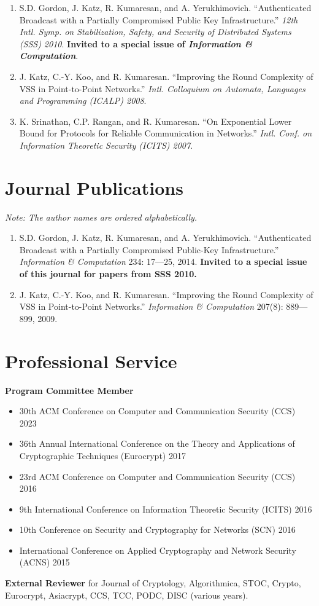 \documentclass[11pt]{article}
\begin{document}
\begin{enumerate}[leftmargin=*, itemsep=1pt]
    \item S.D. Gordon, J. Katz, R. Kumaresan, and A. Yerukhimovich. ``Authenticated Broadcast with a Partially Compromised Public Key Infrastructure.'' \textit{12th Intl. Symp. on Stabilization, Safety, and Security of Distributed Systems (SSS) 2010}. \textbf{Invited to a special issue of \textit{Information \& Computation}}.
    
    \item J. Katz, C.-Y. Koo, and R. Kumaresan. ``Improving the Round Complexity of VSS in Point-to-Point Networks.'' \textit{Intl. Colloquium on Automata, Languages and Programming (ICALP) 2008}.
    
    \item K. Srinathan, C.P. Rangan, and R. Kumaresan. ``On Exponential Lower Bound for Protocols for Reliable Communication in Networks.'' \textit{Intl. Conf. on Information Theoretic Security (ICITS) 2007}.
\end{enumerate}

\section{Journal Publications}
\textit{Note: The author names are ordered alphabetically.}
\begin{enumerate}[leftmargin=*, itemsep=1pt]
    \item S.D. Gordon, J. Katz, R. Kumaresan, and A. Yerukhimovich. ``Authenticated Broadcast with a Partially Compromised Public-Key Infrastructure.'' \textit{Information \& Computation} 234: 17—25, 2014. \textbf{Invited to a special issue of this journal for papers from SSS 2010.}
    
    \item J. Katz, C.-Y. Koo, and R. Kumaresan. ``Improving the Round Complexity of VSS in Point-to-Point Networks.'' \textit{Information \& Computation} 207(8): 889—899, 2009.
\end{enumerate}

\section{Professional Service}
\textbf{Program Committee Member}
\begin{itemize}[leftmargin=*, noitemsep]
    \item 30th ACM Conference on Computer and Communication Security (CCS) 2023
    \item 36th Annual International Conference on the Theory and Applications of Cryptographic Techniques (Eurocrypt) 2017
    \item 23rd ACM Conference on Computer and Communication Security (CCS) 2016
    \item 9th International Conference on Information Theoretic Security (ICITS) 2016
    \item 10th Conference on Security and Cryptography for Networks (SCN) 2016
    \item International Conference on Applied Cryptography and Network Security (ACNS) 2015
\end{itemize}

\textbf{External Reviewer} for Journal of Cryptology, Algorithmica, STOC, Crypto, Eurocrypt, Asiacrypt, CCS, TCC, PODC, DISC (various years).
\end{document}

